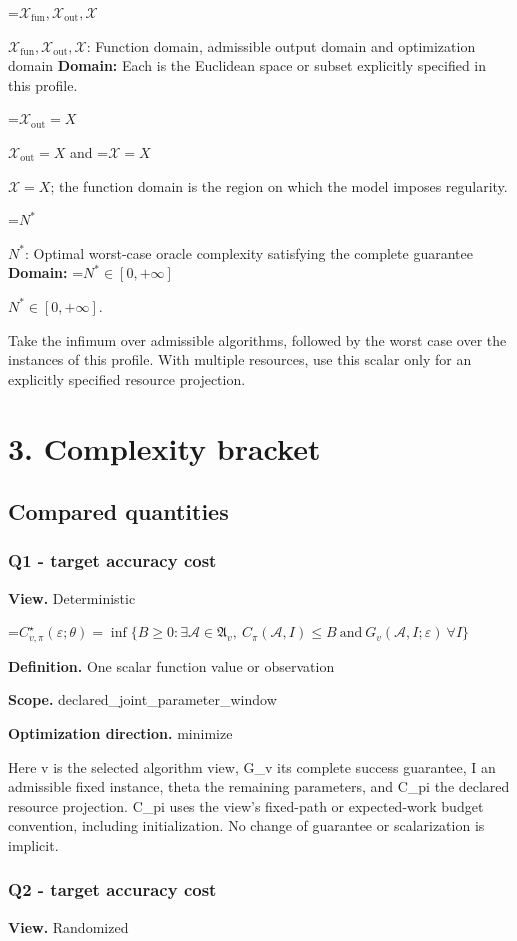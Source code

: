 \documentclass[10pt,a4paper]{article}
\newcommand{\AtlasMath}[1]{\par\begingroup\centering\setbox0=\hbox{$\displaystyle #1$}\ifdim\wd0>1.4\linewidth\typeout{ATLAS WIDE FORMULA: \the\wd0}\fi\ifdim\wd0>\linewidth\resizebox{\linewidth}{!}{\box0}\else\box0\fi\par\endgroup}
\newcommand{\AtlasInlineMath}[1]{\begingroup\setbox0=\hbox{$#1$}\ifdim\wd0>.4\linewidth\endgroup\AtlasMath{#1}\else\endgroup$#1$\fi}
\begin{document}
\AtlasInlineMath{\mathcal{X}_{\mathrm{fun}},\mathcal{X}_{\mathrm{out}},\mathcal{X}}: Function domain, admissible output domain and optimization domain \textbf{Domain:} Each is the Euclidean space or subset explicitly specified in this profile.

\AtlasInlineMath{\mathcal{X}_{\mathrm{out}}=X} and \AtlasInlineMath{\mathcal{X}=X}; the function domain is the region on which the model imposes regularity.

\AtlasInlineMath{N^*}: Optimal worst-case oracle complexity satisfying the complete guarantee \textbf{Domain:} \AtlasInlineMath{N^*\in[0,+\infty]}.

Take the infimum over admissible algorithms, followed by the worst case over the instances of this profile. With multiple resources, use this scalar only for an explicitly specified resource projection.

\section{3. Complexity bracket}
\subsection{Compared quantities}
\subsubsection{Q1 - target accuracy cost}
\textbf{View.} Deterministic

\AtlasMath{C^\star_{v,\pi}(\varepsilon;\theta)=\inf\{B\ge0:\exists\mathcal A\in\mathfrak A_v,\ C_\pi(\mathcal A,I)\le B\ \text{and}\ G_v(\mathcal A,I;\varepsilon)\ \forall I\}}
\textbf{Definition.} One scalar function value or observation

\textbf{Scope.} declared\_joint\_parameter\_window

\textbf{Optimization direction.} minimize

Here v is the selected algorithm view, G\_v its complete success guarantee, I an admissible fixed instance, theta the remaining parameters, and C\_pi the declared resource projection. C\_pi uses the view's fixed-path or expected-work budget convention, including initialization. No change of guarantee or scalarization is implicit.

\subsubsection{Q2 - target accuracy cost}
\textbf{View.} Randomized
\end{document}
